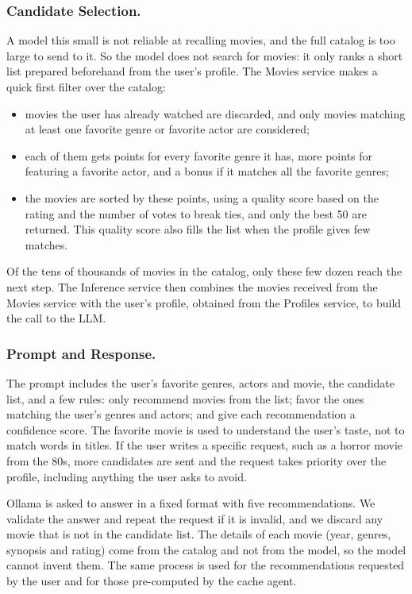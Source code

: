 \documentclass[10pt]{llncs}
\begin{document}
\subsubsection{Candidate Selection.}

A model this small is not reliable at recalling movies, and the full catalog is too large to send to it. So the model does not search for movies: it only ranks a short list prepared beforehand from the user's profile. The Movies service makes a quick first filter over the catalog:
\begin{itemize}
    \item movies the user has already watched are discarded, and only movies matching at least one favorite genre or favorite actor are considered;
    \item each of them gets points for every favorite genre it has, more points for featuring a favorite actor, and a bonus if it matches all the favorite genres;
    \item the movies are sorted by these points, using a quality score based on the rating and the number of votes to break ties, and only the best 50 are returned. This quality score also fills the list when the profile gives few matches.
\end{itemize}
Of the tens of thousands of movies in the catalog, only these few dozen reach the next step. The Inference service then combines the movies received from the Movies service with the user's profile, obtained from the Profiles service, to build the call to the LLM.

\subsubsection{Prompt and Response.}

The prompt includes the user's favorite genres, actors and movie, the candidate list, and a few rules: only recommend movies from the list; favor the ones matching the user's genres and actors; and give each recommendation a confidence score. The favorite movie is used to understand the user's taste, not to match words in titles. If the user writes a specific request, such as a horror movie from the 80s, more candidates are sent and the request takes priority over the profile, including anything the user asks to avoid.

Ollama is asked to answer in a fixed format with five recommendations. We validate the answer and repeat the request if it is invalid, and we discard any movie that is not in the candidate list. The details of each movie (year, genres, synopsis and rating) come from the catalog and not from the model, so the model cannot invent them. The same process is used for the recommendations requested by the user and for those pre-computed by the cache agent.
\end{document}
